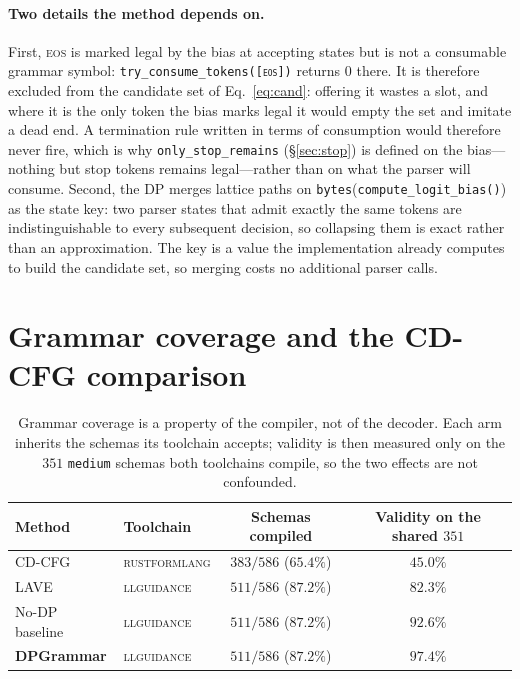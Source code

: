 \documentclass{article}
\begin{document}
\paragraph{Two details the method depends on.}
First, \textsc{eos} is marked legal by the bias at accepting states but is not a
consumable grammar symbol: \texttt{try\_consume\_tokens([\textsc{eos}])} returns
$0$ there. It is therefore excluded from the candidate set of
Eq.~\ref{eq:cand}: offering it wastes a slot, and where it is the only token the
bias marks legal it would empty the set and imitate a dead end. A termination rule written in terms of consumption would therefore
never fire, which is why \texttt{only\_stop\_remains} (\S\ref{sec:stop}) is
defined on the bias---nothing but stop tokens remains legal---rather than on
what the parser will consume. Second, the DP merges lattice paths on
\texttt{bytes}(\texttt{compute\_logit\_bias()}) as the state key: two parser
states that admit exactly the same tokens are indistinguishable to every
subsequent decision, so collapsing them is exact rather than an approximation.
The key is a value the implementation already computes to build the candidate
set, so merging costs no additional parser calls.




\section{Grammar coverage and the CD-CFG comparison}
\label{sec:coverage}

\begin{table}[t]
\centering
\small
\caption{Grammar coverage is a property of the compiler, not of the decoder.
Each arm inherits the schemas its toolchain accepts; validity is then measured
only on the $351$ \texttt{medium} schemas both toolchains compile, so the two
effects are not confounded.}
\label{tab:coverage}
\begin{tabular}{llcc}
\toprule
Method & Toolchain & Schemas compiled & Validity on the shared $351$ \\
\midrule
CD-CFG             & \textsc{rustformlang} & $383/586$ ($65.4\%$) & $45.0\%$ \\
LAVE               & \textsc{llguidance}   & $511/586$ ($87.2\%$) & $82.3\%$ \\
No-DP baseline     & \textsc{llguidance}   & $511/586$ ($87.2\%$) & $92.6\%$ \\
\textbf{DPGrammar} & \textsc{llguidance}   & $511/586$ ($87.2\%$) & $\mathbf{97.4\%}$ \\
\bottomrule
\end{tabular}
\end{table}
\end{document}
